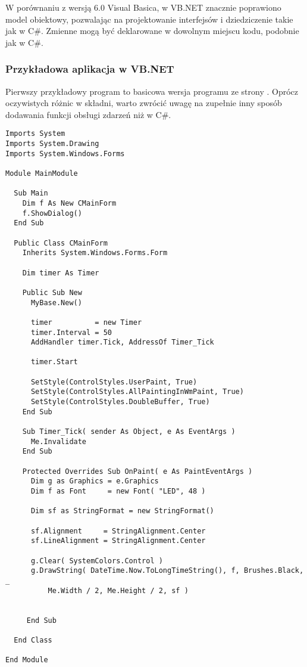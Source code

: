 W porównaniu z wersją 6.0 Visual Basica, w VB.NET znacznie poprawiono model obiektowy, pozwalając
na projektowanie interfejsów i dziedziczenie takie jak w C\#. Zmienne mogą być deklarowane w dowolnym
miejscu kodu, podobnie jak w C\#.

\subsubsection{Przykładowa aplikacja w VB.NET}

Pierwszy przykładowy program to basicowa wersja programu ze strony \pageref{kodZegarek}.
Oprócz oczywistych różnic w składni, warto zwrócić uwagę na zupełnie inny sposób dodawania 
funkcji obsługi zdarzeń niż w C\#.

\begin{scriptsize}
\begin{verbatim}
Imports System
Imports System.Drawing
Imports System.Windows.Forms

Module MainModule

  Sub Main
    Dim f As New CMainForm
    f.ShowDialog()
  End Sub
	
  Public Class CMainForm
    Inherits System.Windows.Forms.Form

    Dim timer As Timer

    Public Sub New
      MyBase.New()

      timer          = new Timer
      timer.Interval = 50 
      AddHandler timer.Tick, AddressOf Timer_Tick 

      timer.Start

      SetStyle(ControlStyles.UserPaint, True)
      SetStyle(ControlStyles.AllPaintingInWmPaint, True)
      SetStyle(ControlStyles.DoubleBuffer, True)
    End Sub

    Sub Timer_Tick( sender As Object, e As EventArgs )
      Me.Invalidate
    End Sub

    Protected Overrides Sub OnPaint( e As PaintEventArgs )
      Dim g as Graphics = e.Graphics
      Dim f as Font     = new Font( "LED", 48 )

      Dim sf as StringFormat = new StringFormat()

      sf.Alignment     = StringAlignment.Center
      sf.LineAlignment = StringAlignment.Center

      g.Clear( SystemColors.Control )
      g.DrawString( DateTime.Now.ToLongTimeString(), f, Brushes.Black, _
          Me.Width / 2, Me.Height / 2, sf )


     End Sub
		
  End Class
	
End Module 
\end{verbatim}
\end{scriptsize}

